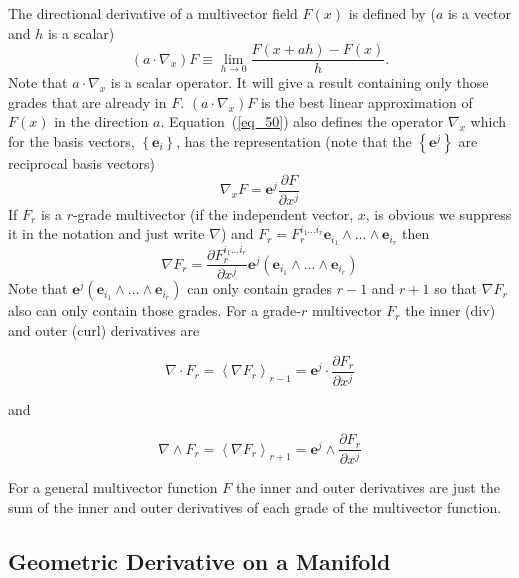 \documentclass[12pt]{report}
\newcommand{\bm}[1]{\boldsymbol{#1}}
\newcommand{\bfrac}[2]{\displaystyle\frac{#1}{#2}}
\newcommand{\lp}{\left (}
\newcommand{\rp}{\right )}
\newcommand{\pdiff}[2]{\bfrac{\partial {#1}}{\partial {#2}}}
\newcommand{\lbrc}{\left \{}
\newcommand{\rbrc}{\right \}}
\newcommand{\set}[1]{\lbrc {#1} \rbrc}
\newcommand{\W}{\wedge}
\newcommand{\f}[2]{{#1}\lp {#2} \rp}
\newcommand{\paren}[1]{\lp {#1} \rp}
\newcommand{\be}{\begin{equation}}
\newcommand{\ee}{\end{equation}}
\begin{document}
The directional derivative of a multivector field $\f{F}{x}$ is defined by ($a$ is a vector and $h$ is a scalar)
\be\label{eq_50}
 \paren{a\cdot\nabla_{x}}F \equiv \lim_{h\rightarrow 0}\bfrac{\f{F}{x+ah}-\f{F}{x}}{h}.
\ee
Note that $a\cdot\nabla_{x}$ is a scalar operator.  It will give a result containing only those grades
that are already in $F$.  $\paren{a\cdot\nabla_{x}}F$ is the best linear approximation of $\f{F}{x}$
in the direction $a$.  Equation~(\ref{eq_50}) also defines the operator $\nabla_{x}$ which for
the basis vectors, $\set{\bm{e}_{i}}$, has the representation (note that the $\set{\bm{e}^{j}}$ are reciprocal
basis vectors)
\begin{equation}
    \nabla_{x} F = \bm{e}^{j}\bfrac{\partial F}{\partial x^{j}}
\end{equation}
If $F_{r}$ is a $r$-grade multivector (if the independent vector, $x$, is obvious we suppress it in the
notation and just write $\nabla$) and
$F_{r} = F_{r}^{i_{1}\dots i_{r}}\bm{e}_{i_{1}}\W\dots\W \bm{e}_{i_{r}}$
then
  \begin{equation}
    \nabla F_{r} = \bfrac{\partial F_{r}^{i_{1}\dots i_{r}}}{\partial x^{j}}\bm{e}^{j}\lp\bm{e}_{i_{1}}\W
                 \dots\W \bm{e}_{i_{r}} \rp
  \end{equation}
Note that
$\bm{e}^{j}\lp\bm{e}_{i_{1}}\W\dots\W \bm{e}_{i_{r}} \rp$
can only contain grades $r-1$ and $r+1$ so that $\nabla F_{r}$
also can only contain those grades. For a grade-$r$ multivector
$F_{r}$ the inner (div) and outer (curl) derivatives are

  \begin{equation}
  \nabla\cdot F_{r} = \left < \nabla F_{r}\right >_{r-1} = \bm{e}^{j}\cdot \pdiff{F_{r}}{x^{j}}
  \end{equation}

and

  \begin{equation}
  \nabla\W F_{r} = \left < \nabla F_{r}\right >_{r+1} = \bm{e}^{j}\W \pdiff{F_{r}}{x^{j}}
  \end{equation}

For a general multivector function $F$ the inner and outer derivatives are
just the sum of the inner and outer derivatives of each grade of the multivector
function.

\subsection{Geometric Derivative on a Manifold}
\end{document}
